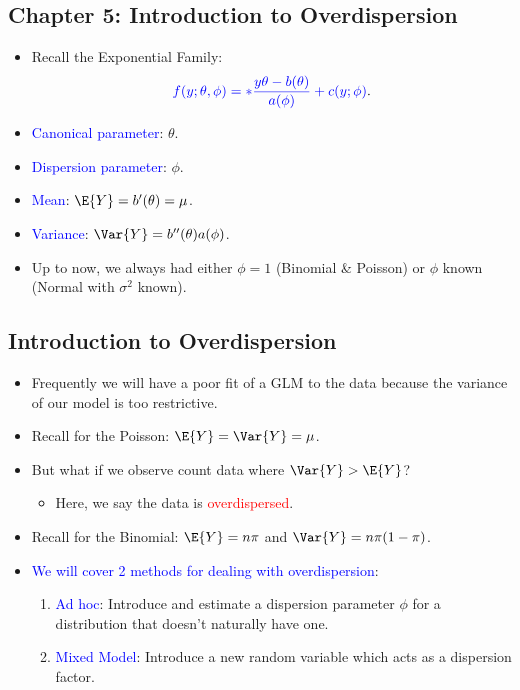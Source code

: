 \documentclass{article}\usepackage[]{graphicx}\usepackage[svgnames]{xcolor}
\let\exp\relax%
\begin{document}
\subsection*{Chapter 5: Introduction to Overdispersion}
\begin{itemize}
      \item Recall the Exponential Family:
            \[ \textcolor{Blue}{ f(y;\theta,\phi)=\exp*{\frac{y\theta-b(\theta)}{a(\phi)}+c(y;\phi)} }. \]
      \item \textcolor{Blue}{Canonical parameter}: $ \theta $.
      \item \textcolor{Blue}{Dispersion parameter}: $ \phi $.
      \item \textcolor{Blue}{Mean}: $ \E{Y}=b^\prime(\theta)=\mu $.
      \item \textcolor{Blue}{Variance}: $ \Var{Y}=b^{\prime\prime}(\theta)a(\phi) $.
      \item Up to now, we always had either $ \phi=1 $ (Binomial \& Poisson) or $ \phi $ known (Normal with $ \sigma^2 $ known).
\end{itemize}
\subsection*{Introduction to Overdispersion}
\begin{itemize}
      \item Frequently we will have a poor fit of a GLM to the data because the variance of
            our model is too restrictive.
      \item Recall for the Poisson: $ \E{Y}=\Var{Y}=\mu $.
      \item But what if we observe count data where $ \Var{Y}>\E{Y} $?
            \begin{itemize}
                  \item Here, we say the data is \textcolor{Red}{overdispersed}.
            \end{itemize}
      \item Recall for the Binomial: $ \E{Y}=n\pi $ and $ \Var{Y}=n\pi(1-\pi) $.
      \item \textcolor{Blue}{We will cover 2 methods for dealing with overdispersion}:
            \begin{enumerate}[1.]
                  \item \textcolor{Blue}{Ad hoc}: Introduce and estimate a dispersion parameter $ \phi $ for a distribution that
                        doesn't naturally have one.
                  \item \textcolor{Blue}{Mixed Model}: Introduce a new random variable which acts as a dispersion factor.
            \end{enumerate}
\end{itemize}
\end{document}
